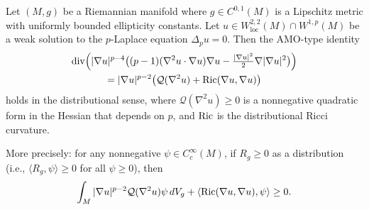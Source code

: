 \begin{lemma}\label{lem:DistBochnerLipschitz}
Let $(M, g)$ be a Riemannian manifold where $g \in C^{0,1}(M)$ is a Lipschitz metric with uniformly bounded ellipticity constants. Let $u \in W^{2,2}_{\mathrm{loc}}(M) \cap W^{1,p}(M)$ be a weak solution to the $p$-Laplace equation $\Delta_p u = 0$. Then the AMO-type identity
\begin{multline}\label{eq:DistBochnerIdentity}
    \mathrm{div}\Bigl(|\nabla u|^{p-4}\bigl((p-1)(\nabla^2 u \cdot \nabla u) \nabla u - \tfrac{|\nabla u|^2}{2}\nabla|\nabla u|^2\bigr)\Bigr) \\
    = |\nabla u|^{p-2}\bigl(\mathcal{Q}(\nabla^2 u) + \mathrm{Ric}(\nabla u, \nabla u)\bigr)
\end{multline}
holds in the distributional sense, where $\mathcal{Q}(\nabla^2 u) \ge 0$ is a nonnegative quadratic form in the Hessian that depends on $p$, and $\mathrm{Ric}$ is the distributional Ricci curvature.

More precisely: for any nonnegative $\psi \in C^\infty_c(M)$, if $R_g \ge 0$ as a distribution (i.e., $\langle R_g, \psi \rangle \ge 0$ for all $\psi \ge 0$), then
\begin{equation}
    \int_M |\nabla u|^{p-2} \mathcal{Q}(\nabla^2 u) \psi \, dV_g + \langle \mathrm{Ric}(\nabla u, \nabla u), \psi \rangle \ge 0.
\end{equation}
\end{lemma}

